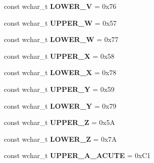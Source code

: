 \begin{DoxyCompactItemize}
\item 
\hypertarget{group___indexing_gadbc065fe65fa45b48fd189bf6c0a79a0}{const wchar\-\_\-t {\bfseries L\-O\-W\-E\-R\-\_\-\-V} = 0x76}\label{group___indexing_gadbc065fe65fa45b48fd189bf6c0a79a0}

\item 
\hypertarget{group___indexing_ga931cd0048a52dd6170fb20400fad163b}{const wchar\-\_\-t {\bfseries U\-P\-P\-E\-R\-\_\-\-W} = 0x57}\label{group___indexing_ga931cd0048a52dd6170fb20400fad163b}

\item 
\hypertarget{group___indexing_ga3c012af3f360725580eb2fa586d0b001}{const wchar\-\_\-t {\bfseries L\-O\-W\-E\-R\-\_\-\-W} = 0x77}\label{group___indexing_ga3c012af3f360725580eb2fa586d0b001}

\item 
\hypertarget{group___indexing_ga613d3ce9f22d020b3ca751bb4ed3a9ff}{const wchar\-\_\-t {\bfseries U\-P\-P\-E\-R\-\_\-\-X} = 0x58}\label{group___indexing_ga613d3ce9f22d020b3ca751bb4ed3a9ff}

\item 
\hypertarget{group___indexing_ga4bf9cd193941ad22a0c442121e869767}{const wchar\-\_\-t {\bfseries L\-O\-W\-E\-R\-\_\-\-X} = 0x78}\label{group___indexing_ga4bf9cd193941ad22a0c442121e869767}

\item 
\hypertarget{group___indexing_ga4a625f5707841bcbecdca659d822576a}{const wchar\-\_\-t {\bfseries U\-P\-P\-E\-R\-\_\-\-Y} = 0x59}\label{group___indexing_ga4a625f5707841bcbecdca659d822576a}

\item 
\hypertarget{group___indexing_ga135cc5a13bd6b2e17b149e3122abece3}{const wchar\-\_\-t {\bfseries L\-O\-W\-E\-R\-\_\-\-Y} = 0x79}\label{group___indexing_ga135cc5a13bd6b2e17b149e3122abece3}

\item 
\hypertarget{group___indexing_ga7f65a4297b3a337dd4c8953e9adcfff7}{const wchar\-\_\-t {\bfseries U\-P\-P\-E\-R\-\_\-\-Z} = 0x5\-A}\label{group___indexing_ga7f65a4297b3a337dd4c8953e9adcfff7}

\item 
\hypertarget{group___indexing_gad5509b4116c36508f2c1fa92cf88706b}{const wchar\-\_\-t {\bfseries L\-O\-W\-E\-R\-\_\-\-Z} = 0x7\-A}\label{group___indexing_gad5509b4116c36508f2c1fa92cf88706b}

\item 
\hypertarget{group___indexing_ga9d4b4564cfe020cc9a9e82f3f5fcd6e4}{const wchar\-\_\-t {\bfseries U\-P\-P\-E\-R\-\_\-\-A\-\_\-\-A\-C\-U\-T\-E} = 0x\-C1}\label{group___indexing_ga9d4b4564cfe020cc9a9e82f3f5fcd6e4}


\end{DoxyCompactItemize}
